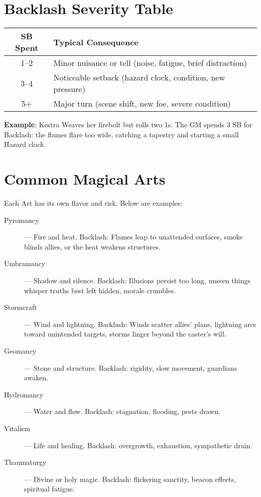 \section*{Backlash Severity Table}

\begin{center}
\begin{tabular}{cl}
\toprule
\textbf{SB Spent} & \textbf{Typical Consequence} \\
\midrule
1--2 & Minor nuisance or tell (noise, fatigue, brief distraction) \\
3--4 & Noticeable setback (hazard clock, condition, new pressure) \\
5+ & Major turn (scene shift, new foe, severe condition) \\
\bottomrule
\end{tabular}
\end{center}

\textbf{Example}: Kestra Weaves her firebolt but rolls two 1s. The GM spends 3 SB for Backlash: the flames flare too wide, catching a tapestry and starting a small Hazard clock.

\section*{Common Magical Arts}

Each Art has its own flavor and risk. Below are examples:

\begin{description}
    \item[Pyromancy] --- Fire and heat. Backlash: Flames leap to unattended surfaces, smoke blinds allies, or the heat weakens structures.
    \item[Umbramancy] --- Shadow and silence. Backlash: Illusions persist too long, unseen things whisper truths best left hidden, morale crumbles.
    \item[Stormcraft] --- Wind and lightning. Backlash: Winds scatter allies' plans, lightning arcs toward unintended targets, storms linger beyond the caster's will.
    \item[Geomancy] --- Stone and structure. Backlash: rigidity, slow movement, guardians awaken.
    \item[Hydromancy] --- Water and flow. Backlash: stagnation, flooding, pests drawn.
    \item[Vitalism] --- Life and healing. Backlash: overgrowth, exhaustion, sympathetic drain.
    \item[Thaumaturgy] --- Divine or holy magic. Backlash: flickering sanctity, beacon effects, spiritual fatigue.
\end{description}

